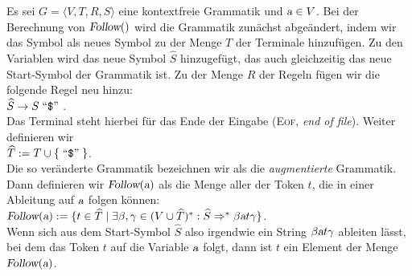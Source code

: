 \begin{Definition}
Es sei $G = \langle V, T, R, S \rangle$ eine kontextfreie Grammatik und $\textsl{a} \in V$.
Bei der Berechnung von $\textsl{Follow}()$ wird die Grammatik zunächst abgeändert,
indem wir das Symbol  als neues Symbol zu der Menge $T$ der Terminale
hinzufügen.  Zu den Variablen wird das neue Symbol $\widehat{S}$ hinzugefügt, das auch
gleichzeitig das neue Start-Symbol der Grammatik ist.  Zu der Menge $R$ der Regeln
fügen wir die folgende Regel neu hinzu:
\\[0.2cm]
\hspace*{1.3cm}
$\widehat{S} \rightarrow S \quoted{\symbol{36}}$.
\\[0.2cm]
Das Terminal  steht hierbei für das Ende der Eingabe (\textsc{Eof},
\emph{end of file}).
Weiter definieren wir
\\[0.2cm]
\hspace*{1.3cm}
 $\widehat{T} := T \cup \{ \quoted{\symbol{36}} \}$.
\\[0.2cm]
Die so veränderte Grammatik bezeichnen wir als die \emph{augmentierte} Grammatik.
Dann definieren wir $\textsl{Follow}(\textsl{a})$ als die Menge aller der Token $t$, die in einer
Ableitung auf $\textsl{a}$ folgen können:
\\[0.2cm]
\hspace*{1.3cm}
$\textsl{Follow}(\textsl{a}) := 
 \{ t \in \widehat{T} \mid \exists \beta,\gamma \in (V \cup \widehat{T})^*: 
                           \widehat{S} \Rightarrow^* \beta \textsl{a} t \gamma 
  \}
$.
\\[0.2cm]
Wenn sich aus dem Start-Symbol $\widehat{S}$ also irgendwie ein String $\beta \textsl{a} t\gamma$ ableiten lässt,
bei dem das Token $t$ auf die Variable $\textsl{a}$ folgt, dann ist $t$ ein Element
der Menge $\textsl{Follow}(\textsl{a})$.
\eox
\end{Definition}

